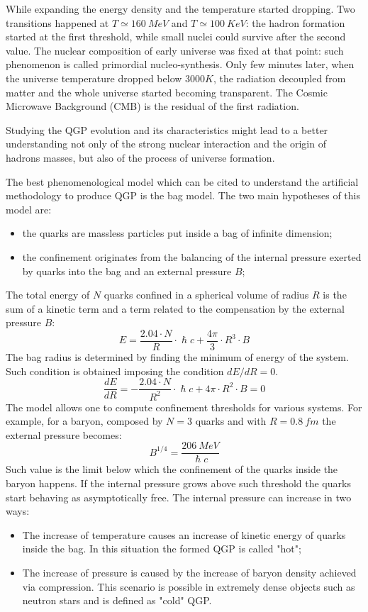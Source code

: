 While expanding the energy density and the temperature started dropping.
Two transitions happened at $T\simeq160\ MeV$ and $T\simeq100\ KeV$: the hadron formation started at the first threshold, while small nuclei could survive after the second value.
The nuclear composition of early universe was fixed at that point: such phenomenon is called primordial nucleo-synthesis.
Only few minutes later, when the universe temperature dropped below $3000K$, the radiation decoupled from matter and the whole universe started becoming transparent.
The Cosmic Microwave Background (CMB) is the residual of the first radiation.

Studying the QGP evolution and its characteristics might lead to a better understanding not only of the strong nuclear interaction and the origin of hadrons masses, but also of the process of universe formation.

The best phenomenological model which can be cited to understand the artificial methodology to produce QGP is the bag model.
The two main hypotheses of this model are:
\begin{itemize}
    \item the quarks are massless particles put inside a bag of infinite dimension;
    \item the confinement originates from the balancing of the internal pressure exerted by quarks into the bag and an external pressure $B$;
\end{itemize}
The total energy of $N$ quarks confined in a spherical volume of radius $R$ is the sum of a kinetic term and a term related to the compensation by the external pressure $B$:
\begin{equation}
    E=\frac{2.04\cdot N}{R}\cdot \hslash c + \frac{4\pi}{3}\cdot R^3\cdot B
\end{equation}
The bag radius is determined by finding the minimum of energy of the system.
Such condition is obtained imposing the condition $dE/dR=0$.
\begin{equation}
\frac{dE}{dR}=-\frac{2.04\cdot N}{R^2}\cdot \hslash c + 4\pi\cdot R^2\cdot B = 0
\end{equation}
The model allows one to compute confinement thresholds for various systems.
For example, for a baryon, composed by $N=3$ quarks and with $R=0.8\ fm$ the external pressure becomes:
\begin{equation}
B^{1/4} = \frac{206\ MeV}{\hslash c}
\end{equation}
Such value is the limit below which the confinement of the quarks inside the baryon happens.
If the internal pressure grows above such threshold the quarks start behaving as asymptotically free.
The internal pressure can increase in two ways:
\begin{itemize}
\item The increase of temperature causes an increase of kinetic energy of quarks inside the bag. In this situation the formed QGP is called "hot";
\item The increase of pressure is caused by the increase of baryon density achieved via compression. This scenario is possible in extremely dense objects such as neutron stars and is defined as "cold" QGP.
\end{itemize}

